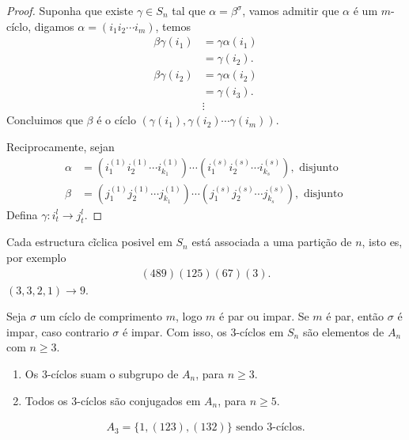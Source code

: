 \begin{proof} 
  Suponha que existe $\gamma\in S_n$ tal que $\alpha=\beta^{\sigma}$, vamos admitir que $\alpha$ é um $m$-cíclo, digamos $\alpha=(i_1i_2\cdots i_m)$, temos
  \begin{align*}
    \beta\gamma(i_1)&=\gamma\alpha(i_1)\\
    &=\gamma(i_2).\\
    \beta\gamma(i_2)&=\gamma\alpha(i_2)\\
    &=\gamma(i_3).\\
    &\vdots
  \end{align*}
  Concluimos que $\beta$ é o cíclo $(\gamma(i_1),\gamma(i_2)\cdots\gamma(i_m))$.

  Reciprocamente, sejan
  \begin{align*}
    \alpha&=(i_1^{(1)}i_2^{(1)}\cdots i_{k_1}^{(1)})\cdots(i_1^{(s)}i_{2}^{(s)}\cdots i_{k_s}^{(s)}),\text{ disjunto }\\
    \beta&=(j_1^{(1)}j_2^{(1)}\cdots j_{k_1}^{(1)})\cdots(j_1^{(s)}j_{2}^{(s)}\cdots j_{k_s}^{(s)}),\text{ disjunto }
  \end{align*}
  Defina $\gamma: i_t^{l}\to j_t^{l}$.
\end{proof}
\begin{note}
  Cada estructura cĩclica posivel em $S_n$ está associada a uma partição de $n$, isto es, por exemplo
  \begin{align*}
    (489)(125)(67)(3).
  \end{align*}
  $(3,3,2,1)\to 9$.
\end{note}
\begin{note}
  Seja $\sigma$ um cíclo de comprimento $m$, logo $m$ é par ou impar. Se $m$ é par, então $\sigma$ é impar, caso contrario $\sigma$ é impar. Com isso, os $3$-cíclos em $S_n$ são elementos de $A_n$ com $n\geq 3$. 
\end{note}
\begin{proposition}
  \begin{enumerate}
    \item Os $3$-cíclos suam o subgrupo de $A_n$, para $n\geq 3$.
    \item Todos os $3$-cíclos são conjugados em $A_n$, para $n\geq  5$.
  \end{enumerate}
  \begin{align*}
    A_3=\{1,(123),(132)\}\text{ sendo $3$-cíclos.} 
  \end{align*}
\end{proposition}
